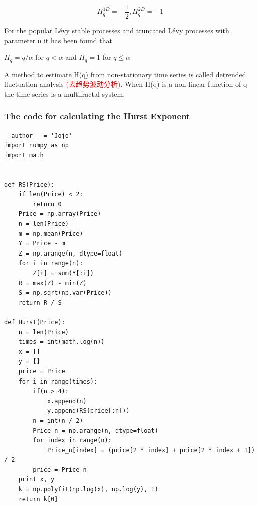 \documentclass[12pt]{article}
\newcommand{\red}[1]{  \textcolor{red}  {#1}}   %
\begin{document}
$$H^{1D}_q = -\frac{1}{2}, H^{2D}_q = -1$$

For the popular Lévy stable processes and truncated Lévy processes with parameter α it has been found that

$H_q = q/\alpha$ for $q < \alpha$ and $H_q = 1$ for $q \le \alpha$

A method to estimate H(q) from non-stationary time series is called detrended fluctuation analysis\red{(去趋势波动分析)}. When H(q) is a non-linear function of q the time series is a multifractal system.

\subsubsection{The code for calculating the Hurst Exponent}
\begin{lstlisting}
__author__ = 'Jojo'
import numpy as np
import math


def RS(Price):
    if len(Price) < 2:
        return 0
    Price = np.array(Price)
    n = len(Price)
    m = np.mean(Price)
    Y = Price - m
    Z = np.arange(n, dtype=float)
    for i in range(n):
        Z[i] = sum(Y[:i])
    R = max(Z) - min(Z)
    S = np.sqrt(np.var(Price))
    return R / S

def Hurst(Price):
    n = len(Price)
    times = int(math.log(n))
    x = []
    y = []
    price = Price
    for i in range(times):
        if(n > 4):
            x.append(n)
            y.append(RS(price[:n]))
        n = int(n / 2)
        Price_n = np.arange(n, dtype=float)
        for index in range(n):
            Price_n[index] = (price[2 * index] + price[2 * index + 1]) / 2
        price = Price_n
    print x, y
    k = np.polyfit(np.log(x), np.log(y), 1)
    return k[0]
\end{lstlisting}
\end{document}
